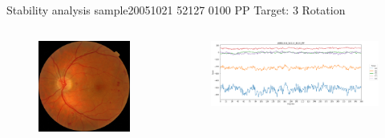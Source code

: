 \documentclass{beamer}
\begin{document}
\begin{frame}{Stability analysis sample}{20051021 52127 0100 PP Target: 3 Rotation}
\begin{columns}
\begin{column}{0.3\textwidth}
	\begin{figure}[p]
		\centering
		\includegraphics[width=\textwidth]{chapter_stability/20051021_52127_0100_PP/20051021_52127_0100_PP.jpeg}
	\end{figure}	
\end{column}
\begin{column}{0.45\textwidth}  %
	\begin{figure}[p]
		\centering
		\includegraphics[width=\textwidth]{chapter_stability/20051021_52127_0100_PP/r/scores.png}
	\end{figure}
	\centering
	\href{run:videos_stability/Messidor_20051021_52127_0100_PP_Target_3_Checking_Rotation_Sensitivity.mp4}{\color{blue}{Rotation Visualization}} 
\end{column}
\end{columns}
\end{frame}
\end{document}
